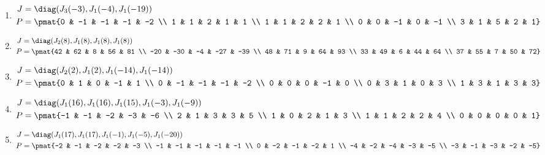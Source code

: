 \begin{enumerate}
\item

\begin{align*}
J &= \diag(J_{3}(-3), J_{1}(-4), J_{1}(-19))\\
P &= \pmat{0 & -1 & -1 & -1 & -2 \\ 1 & 1 & 2 & 1 & 1 \\ 1 & 1 & 2 & 2 & 1 \\ 0 & 0 & -1 & 0 & -1 \\ 3 & 1 & 5 & 2 & 1}
\end{align*}

\item

\begin{align*}
J &= \diag(J_{2}(8), J_{1}(8), J_{1}(8), J_{1}(8))\\
P &= \pmat{42 & 62 & 8 & 56 & 81 \\ -20 & -30 & -4 & -27 & -39 \\ 48 & 71 & 9 & 64 & 93 \\ 33 & 49 & 6 & 44 & 64 \\ 37 & 55 & 7 & 50 & 72}
\end{align*}

\item

\begin{align*}
J &= \diag(J_{2}(2), J_{1}(2), J_{1}(-14), J_{1}(-14))\\
P &= \pmat{0 & 1 & 0 & -1 & 1 \\ 0 & -1 & -1 & -1 & -2 \\ 0 & 0 & 0 & -1 & 0 \\ 0 & 3 & 1 & 0 & 3 \\ 1 & 3 & 1 & 3 & 3}
\end{align*}

\item

\begin{align*}
J &= \diag(J_{1}(16), J_{1}(16), J_{1}(15), J_{1}(-3), J_{1}(-9))\\
P &= \pmat{-1 & -1 & -2 & -3 & -6 \\ 2 & 1 & 3 & 3 & 5 \\ 1 & 0 & 2 & 1 & 3 \\ 1 & 1 & 2 & 2 & 4 \\ 0 & 0 & 0 & 0 & 1}
\end{align*}

\item

\begin{align*}
J &= \diag(J_{1}(17), J_{1}(17), J_{1}(-1), J_{1}(-5), J_{1}(-20))\\
P &= \pmat{-2 & -1 & -2 & -2 & -3 \\ -1 & -1 & -1 & -1 & -1 \\ 0 & -2 & -1 & -2 & 1 \\ -4 & -2 & -4 & -3 & -5 \\ -3 & -1 & -3 & -2 & -5}
\end{align*}


\end{enumerate}
